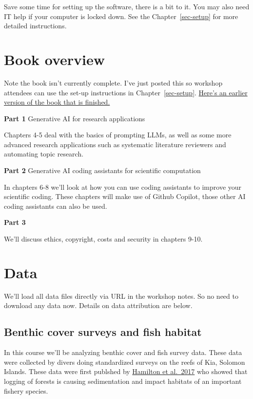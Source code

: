 \documentclass[
  letterpaper,
  DIV=11,
  numbers=noendperiod]{scrreprt}
\begin{document}
Save some time for setting up the software, there is a bit to it. You
may also need IT help if your computer is locked down. See the
Chapter~\ref{sec-setup} for more detailed instructions.

\section{Book overview}\label{book-overview}

Note the book isn't currently complete. I've just posted this so
workshop attendees can use the set-up instructions in
Chapter~\ref{sec-setup}.
\href{https://www.seascapemodels.org/R-llm-workshop/index.html}{Here's
an earlier version of the book that is finished.}

\textbf{Part 1} Generative AI for research applications

Chapters 4-5 deal with the basics of prompting LLMs, as well as some
more advanced research applications such as systematic literature
reviewers and automating topic research.

\textbf{Part 2} Generative AI coding assistants for scientific
computation

In chapters 6-8 we'll look at how you can use coding assistants to
improve your scientific coding. These chapters will make use of Github
Copilot, those other AI coding assistants can also be used.

\textbf{Part 3}

We'll discuss ethics, copyright, costs and security in chapters 9-10.

\section{Data}\label{data}

We'll load all data files directly via URL in the workshop notes. So no
need to download any data now. Details on data attribution are below.

\subsection{Benthic cover surveys and fish
habitat}\label{benthic-cover-surveys-and-fish-habitat}

In this course we'll be analyzing benthic cover and fish survey data.
These data were collected by divers doing standardized surveys on the
reefs of Kia, Solomon Islands. These data were first publshed by
\href{http://dx.doi.org/10.1016/j.biocon.2017.04.024}{Hamilton et
al.~2017} who showed that logging of forests is causing sedimentation
and impact habitats of an important fishery species.
\end{document}
